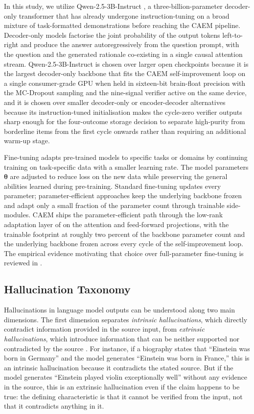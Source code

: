 In this study, we utilize Qwen-2.5-3B-Instruct \cite{qwen25}, a three-billion-parameter decoder-only transformer that has already undergone instruction-tuning on a broad mixture of task-formatted demonstrations before reaching the CAEM pipeline. Decoder-only models factorise the joint probability of the output tokens left-to-right and produce the answer autoregressively from the question prompt, with the question and the generated rationale co-existing in a single causal attention stream. Qwen-2.5-3B-Instruct is chosen over larger open checkpoints because it is the largest decoder-only backbone that fits the CAEM self-improvement loop on a single consumer-grade GPU when held in sixteen-bit brain-float precision with the MC-Dropout sampling and the nine-signal verifier active on the same device, and it is chosen over smaller decoder-only or encoder-decoder alternatives because its instruction-tuned initialisation makes the cycle-zero verifier outputs sharp enough for the four-outcome storage decision to separate high-purity from borderline items from the first cycle onwards rather than requiring an additional warm-up stage.

Fine-tuning adapts pre-trained models to specific tasks or domains by continuing training on task-specific data with a smaller learning rate. The model parameters $\boldsymbol{\theta}$ are adjusted to reduce loss on the new data while preserving the general abilities learned during pre-training. Standard fine-tuning updates every parameter; parameter-efficient approaches keep the underlying backbone frozen and adapt only a small fraction of the parameter count through trainable side-modules. CAEM ships the parameter-efficient path through the low-rank adaptation layer of \cite{hu2022lora} on the attention and feed-forward projections, with the trainable footprint at roughly two percent of the backbone parameter count and the underlying backbone frozen across every cycle of the self-improvement loop. The empirical evidence motivating that choice over full-parameter fine-tuning is reviewed in .

\subsection{Hallucination Taxonomy}
\label{sec:hallucination-taxonomy}

Hallucinations in language model outputs can be understood along two main dimensions. The first dimension separates \textit{intrinsic hallucinations}, which directly contradict information provided in the source input, from \textit{extrinsic hallucinations}, which introduce information that can be neither supported nor contradicted by the source \cite{ji2023survey}. For instance, if a biography states that ``Einstein was born in Germany'' and the model generates ``Einstein was born in France,'' this is an intrinsic hallucination because it contradicts the stated source. But if the model generates ``Einstein played violin exceptionally well'' without any evidence in the source, this is an extrinsic hallucination even if the claim happens to be true: the defining characteristic is that it cannot be verified from the input, not that it contradicts anything in it.

